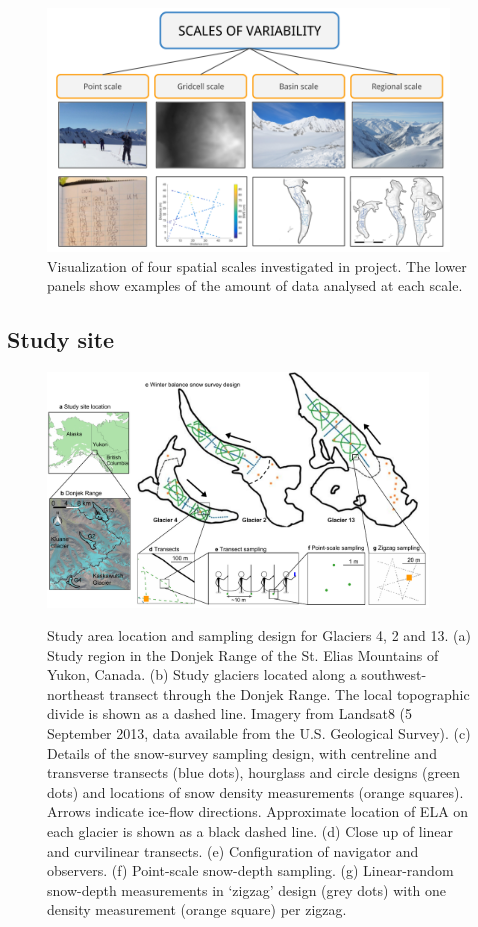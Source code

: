 \documentclass{sfuthesis}
\begin{document}
  \begin{figure}[H]
           \includegraphics[width = 0.95\textwidth]{ScalesOfVariability.png}
       \caption{Visualization of four spatial scales investigated in project. The lower panels show examples of the amount of data analysed at each scale.}
       \label{fig:flowchart_scales}
\end{figure}

\subsection{Study site}

\begin{figure}[H]
	\centering
	\includegraphics[width =0.9\textwidth]{Sampling.pdf}\\
	\caption{Study area location and sampling design for Glaciers 4, 2 and 13. (a) Study region in the Donjek Range of the St. Elias Mountains of Yukon, Canada. (b) Study glaciers located along a southwest-northeast transect through the Donjek Range. The local topographic divide is shown as a dashed line. Imagery from Landsat8 (5 September 2013, data available from the U.S. Geological Survey). (c) Details of the snow-survey sampling design, with centreline and transverse transects (blue dots), hourglass and circle designs (green dots) and locations of snow density measurements (orange squares). Arrows indicate ice-flow directions. Approximate location of ELA on each glacier is shown as a black dashed line. (d) Close up of linear and curvilinear transects. (e) Configuration of navigator and observers. (f) Point-scale snow-depth sampling. (g) Linear-random snow-depth measurements in `zigzag' design (grey dots) with one density measurement (orange square) per zigzag.}
	\label{fig:Sampling}
\end{figure}
\end{document}
